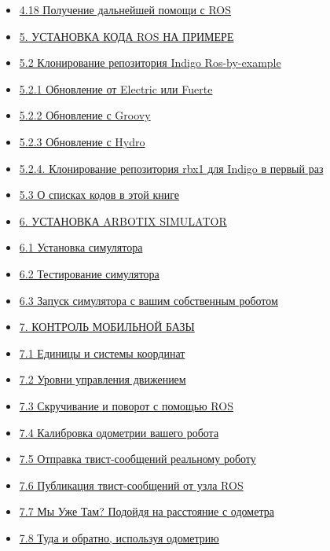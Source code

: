 \begin{itemize}
\item { \href{untitled.md}{4.18 Получение дальнейшей помощи с ROS}} 
\item { \href{untitled-1.md}{5. УСТАНОВКА КОДА ROS НА ПРИМЕРЕ}} 
\item { \href{untitled-2.md}{5.2 Клонирование репозитория Indigo Ros-by-example}} 
\item { \href{5.2.1-obnovlenie-ot-electric-ili-fuerte.md}{5.2.1 Обновление от Electric или Fuerte}} 
\item { \href{5.2.2-obnovlenie-s-groovy.md}{5.2.2 Обновление с Groovy}} 
\item { \href{5.2.3-obnovlenie-s-hydro.md}{5.2.3 Обновление с Hydro}} 
\item { \href{5.2.4.-klonirovanie-repozitoriya-rbx1-dlya-indigo-v-pervyi-raz.md}{5.2.4. Клонирование репозитория rbx1 для Indigo в первый раз}} 
\item { \href{5.3-o-spiskakh-kodov-v-etoi-knige.md}{5.3 О списках кодов в этой книге}} 
\item { \href{6.-ustanovka-arbotix-simulator.md}{6. УСТАНОВКА ARBOTIX SIMULATOR}} 
\item { \href{6.1-ustanovka-simulyatora.md}{6.1 Установка симулятора}} 
\item { \href{6.2-testirovanie-simulyatora.md}{6.2 Тестирование симулятора}} 
\item { \href{6.3-zapusk-simulyatora-s-vashim-sobstvennym-robotom.md}{6.3 Запуск симулятора с вашим собственным роботом}} 
\item { \href{7.-kontrol-mobilnoi-bazy.md}{7. КОНТРОЛЬ МОБИЛЬНОЙ БАЗЫ}} 
\item { \href{7.1-edinicy-i-sistemy-koordinat.md}{7.1 Единицы и системы координат}} 
\item { \href{7.2-urovni-upravleniya-dvizheniem.md}{7.2 Уровни управления движением}} 
\item { \href{7.3-skruchivanie-i-povorot-s-pomoshyu-ros.md}{7.3 Скручивание и поворот с помощью ROS}} 
\item { \href{untitled-17.md}{7.4 Калибровка одометрии вашего робота}} 
\item { \href{untitled-18.md}{7.5 Отправка твист-сообщений реальному роботу}} 
\item { \href{untitled-19.md}{7.6 Публикация твист-сообщений от узла ROS}} 
\item { \href{untitled-3.md}{7.7 Мы Уже Там? Подойдя на расстояние с одометра}} 
\item { \href{untitled-4.md}{7.8 Туда и обратно, используя одометрию}} 

\end{itemize}
